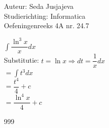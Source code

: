 \documentclass[a4paper]{article}
\newcommand{\integral}{\displaystyle\int}
\begin{document}
\noindent \large Auteur: Seda Jusjajeva\\
\noindent \large Studierichting: Informatica\\
\noindent \large Oefeningenreeks 4A nr. 24.7\\

\medskip

\normalsize

$\integral\dfrac{\ln^3 x}{x}dx$ \\

Substitutie: $t = \ln x \Rightarrow dt = \dfrac{1}{x}dx$ \\

$= \integral t^3dx$ \\

$= \dfrac{t^4}{4} + c$ \\

$= \dfrac{\ln^4 x}{4} + c$ \\



\begin{thebibliography}{999}
\end{thebibliography}
\end{document}
